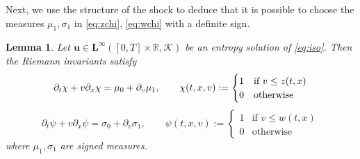 \documentclass[11pt, twoside, reqno]{amsart}
\newtheorem{lemma}[thm]{Lemma}
\theoremstyle{definition}
\theoremstyle{remark}
\numberwithin{equation}{section}
\newcommand{\bs}[1]{\boldsymbol{#1}}
\begin{document}
 Next, we use the structure of the shock to deduce that it is possible to choose the measures  $\mu_1, \sigma_1$ in \eqref{eq:zchi}, \eqref{eq:wchi} with a definite sign.


\begin{lemma}\label{lemma:signedinv}
    Let $\bs u \in \mathbf L^\infty([0,T] \times \mathbb R, \mathcal K)$ be an entropy solution of \eqref{eq:iso}. Then the Riemann invariants satisfy
    \begin{equation}\label{eq:zchi1}
        \partial_t \chi  + v \partial_x \chi = \mu_0 + \partial_v \mu_1, \qquad \chi(t,x,v) := \begin{cases}
            1 & \text{if $ v \leq z(t,x)$}\\
            0 & \text{otherwise}
        \end{cases}
    \end{equation}
    \begin{equation}\label{eq:wchi1}
        \partial_t \psi + v \partial_x \psi = \sigma_0 + \partial_v \sigma_1, \qquad \psi(t,x,v) := \begin{cases}
            1 & \text{if $v \leq w(t,x)$}\\
            0 & \text{otherwise}
            \end{cases}
    \end{equation}
    where $\mu_1, \sigma_1$ are signed measures.
\end{lemma}
\end{document}
